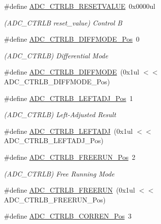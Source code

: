 \begin{DoxyCompactItemize}
\#define \mbox{\hyperlink{group___s_a_m_d21___a_d_c_ga05bc133f816637a15b503b70679f6798}{A\+D\+C\+\_\+\+C\+T\+R\+L\+B\+\_\+\+R\+E\+S\+E\+T\+V\+A\+L\+UE}}~0x0000ul
\begin{DoxyCompactList}\small\item\em (A\+D\+C\+\_\+\+C\+T\+R\+LB reset\+\_\+value) Control B \end{DoxyCompactList}\item 
\#define \mbox{\hyperlink{group___s_a_m_d21___a_d_c_ga908fbe5b6684fe0fce6dee2348e64e30}{A\+D\+C\+\_\+\+C\+T\+R\+L\+B\+\_\+\+D\+I\+F\+F\+M\+O\+D\+E\+\_\+\+Pos}}~0
\begin{DoxyCompactList}\small\item\em (A\+D\+C\+\_\+\+C\+T\+R\+LB) Differential Mode \end{DoxyCompactList}\item 
\#define \mbox{\hyperlink{group___s_a_m_d21___a_d_c_gadaff6645cb6d11956b46833c71b21862}{A\+D\+C\+\_\+\+C\+T\+R\+L\+B\+\_\+\+D\+I\+F\+F\+M\+O\+DE}}~(0x1ul $<$$<$ A\+D\+C\+\_\+\+C\+T\+R\+L\+B\+\_\+\+D\+I\+F\+F\+M\+O\+D\+E\+\_\+\+Pos)
\item 
\#define \mbox{\hyperlink{group___s_a_m_d21___a_d_c_gafdbced27cf9197b2d4933d71a71740c8}{A\+D\+C\+\_\+\+C\+T\+R\+L\+B\+\_\+\+L\+E\+F\+T\+A\+D\+J\+\_\+\+Pos}}~1
\begin{DoxyCompactList}\small\item\em (A\+D\+C\+\_\+\+C\+T\+R\+LB) Left-\/\+Adjusted Result \end{DoxyCompactList}\item 
\#define \mbox{\hyperlink{group___s_a_m_d21___a_d_c_ga5d9a94d02ad8e97b9d977a5cab82516e}{A\+D\+C\+\_\+\+C\+T\+R\+L\+B\+\_\+\+L\+E\+F\+T\+A\+DJ}}~(0x1ul $<$$<$ A\+D\+C\+\_\+\+C\+T\+R\+L\+B\+\_\+\+L\+E\+F\+T\+A\+D\+J\+\_\+\+Pos)
\item 
\#define \mbox{\hyperlink{group___s_a_m_d21___a_d_c_ga931ce86849e963e3d1baf034687fb7d3}{A\+D\+C\+\_\+\+C\+T\+R\+L\+B\+\_\+\+F\+R\+E\+E\+R\+U\+N\+\_\+\+Pos}}~2
\begin{DoxyCompactList}\small\item\em (A\+D\+C\+\_\+\+C\+T\+R\+LB) Free Running Mode \end{DoxyCompactList}\item 
\#define \mbox{\hyperlink{group___s_a_m_d21___a_d_c_ga61fff0174cd97bf889a977f4a5390711}{A\+D\+C\+\_\+\+C\+T\+R\+L\+B\+\_\+\+F\+R\+E\+E\+R\+UN}}~(0x1ul $<$$<$ A\+D\+C\+\_\+\+C\+T\+R\+L\+B\+\_\+\+F\+R\+E\+E\+R\+U\+N\+\_\+\+Pos)
\item 
\#define \mbox{\hyperlink{group___s_a_m_d21___a_d_c_gafce773afb07efbdd9189557974f518b0}{A\+D\+C\+\_\+\+C\+T\+R\+L\+B\+\_\+\+C\+O\+R\+R\+E\+N\+\_\+\+Pos}}~3
$$
\end{DoxyCompactItemize}
